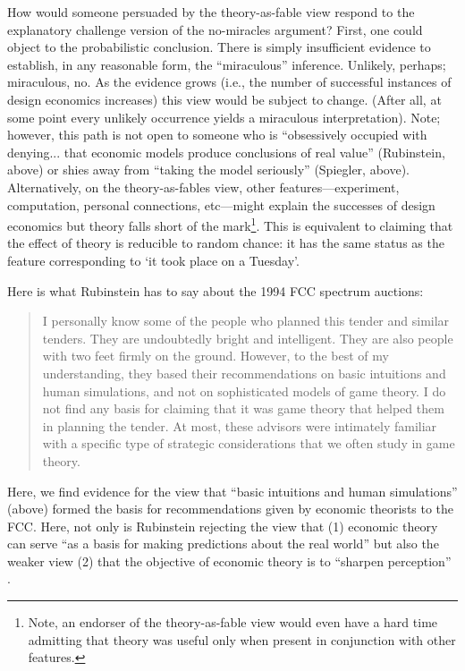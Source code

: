 How would someone persuaded by the theory-as-fable view respond to the explanatory challenge version of the no-miracles argument? First, one could object to the probabilistic conclusion. There is simply insufficient evidence to establish, in any reasonable form, the ``miraculous'' inference. Unlikely, perhaps; miraculous, no. As the evidence grows (i.e., the number of successful instances of design economics increases) this view would be subject to change. (After all, at some point every unlikely occurrence yields a miraculous interpretation). Note; however, this path is not open to someone who is ``obsessively occupied with denying... that economic models produce conclusions of real value'' (Rubinstein, above) or shies away from ``taking the model seriously'' (Spiegler, above). Alternatively, on the theory-as-fables view, other features---experiment, computation, personal connections, etc---might explain the successes of design economics but theory falls short of the mark\footnote{Note, an endorser of the theory-as-fable view would even have a hard time admitting that theory was useful only when present {in conjunction} with other features.}. This is equivalent to claiming that the effect of theory is reducible to random chance: it has the same status as the feature corresponding to `it took place on a Tuesday'. 

Here is what Rubinstein has to say about the 1994 FCC spectrum auctions:
\begin{quote}
    I personally know some of the people who planned this tender and similar tenders. They are undoubtedly bright and intelligent. They are also people with two feet firmly on the ground. However, to the best of my understanding, they based their recommendations on basic intuitions and human simulations, and not on sophisticated models of game theory. I do not find any basis for claiming that it was game theory that helped them in planning the tender. At most, these advisors were intimately familiar with a specific type of strategic considerations that we often study in game theory. \autocite[125]{rubinstein2012}
\end{quote}
Here, we find evidence for the view that ``basic intuitions and human simulations'' (above) formed the basis for recommendations given by economic theorists to the FCC. Here, not only is Rubinstein rejecting the view that (1) economic theory can serve ``as a basis for making predictions about the real world'' \autocite[34]{rubinstein2012} but also the weaker view (2) that the objective of economic theory is to ``sharpen perception'' \autocite[34]{rubinstein2012}. 

